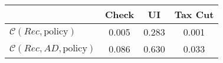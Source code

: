 \begin{tabular}{@{}lccc@{}} 
\toprule 
                          & Check      & UI    & Tax Cut    \\  \midrule 
$\mathcal{C}(Rec,\text{policy})$ & 0.005  & 0.283  & 0.001     \\ 
$\mathcal{C}(Rec, AD,\text{policy})$ & 0.086  & 0.630  & 0.033     \\ 
\end{tabular}  
